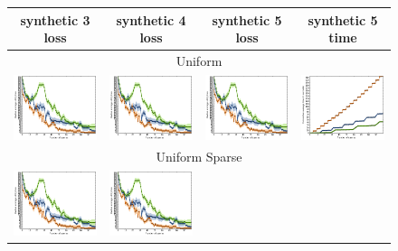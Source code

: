 \documentclass{article}
\renewcommand\[{\begin{equation}}
\renewcommand\]{\end{equation}}
\begin{document}
\begin{figure}[b]
    \centering
    {\footnotesize
    \begin{tabular}{cccc}
        \hline
        {\sc synthetic 3 loss} & {\sc synthetic 4 loss} & {\sc synthetic 5 loss} & {\sc synthetic 5 time}
        \\
        \hline \hline
        \multicolumn{4}{c}{{\sc Uniform}}
        \\
        \includegraphics[width=10em]{figures/loss} &
        \includegraphics[width=10em]{figures/loss} &
        \includegraphics[width=10em]{figures/loss} &
        \includegraphics[width=10em]{figures/time}
        \\
        \hline
        \multicolumn{4}{c}{{\sc Uniform Sparse}}
        \\
        \includegraphics[width=10em]{figures/loss} &
        \includegraphics[width=10em]{figures/loss} &

\end{tabular}}
\end{figure}
\end{document}
